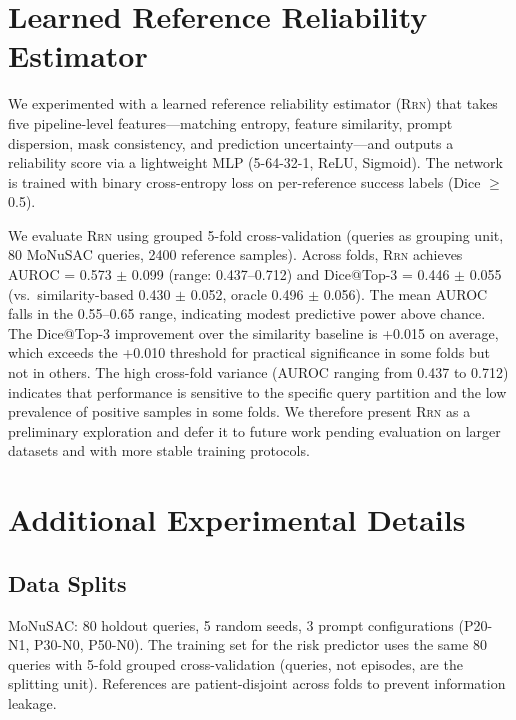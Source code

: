 \documentclass[11pt]{article}
\begin{document}
\appendix

\section{Learned Reference Reliability Estimator}
\label{sec:rrn}

We experimented with a learned reference reliability estimator (\textsc{Rrn})
that takes five pipeline-level features---matching entropy, feature
similarity, prompt dispersion, mask consistency, and prediction
uncertainty---and outputs a reliability score via a lightweight MLP (5-64-32-1,
ReLU, Sigmoid). The network is trained with binary cross-entropy loss on
per-reference success labels (Dice $\geq$ 0.5).

We evaluate \textsc{Rrn} using grouped 5-fold cross-validation (queries as
grouping unit, 80 MoNuSAC queries, 2400 reference samples). Across folds,
\textsc{Rrn} achieves AUROC = 0.573 $\pm$ 0.099 (range: 0.437--0.712) and
Dice@Top-3 = 0.446 $\pm$ 0.055 (vs.\ similarity-based 0.430 $\pm$ 0.052,
oracle 0.496 $\pm$ 0.056). The mean AUROC falls in the 0.55--0.65 range,
indicating modest predictive power above chance. The Dice@Top-3 improvement
over the similarity baseline is +0.015 on average, which exceeds the +0.010
threshold for practical significance in some folds but not in others. The
high cross-fold variance (AUROC ranging from 0.437 to 0.712) indicates that
performance is sensitive to the specific query partition and the
low prevalence of positive samples in some folds. We therefore present
\textsc{Rrn} as a preliminary exploration and defer it to future work
pending evaluation on larger datasets and with more stable training
protocols.

\section{Additional Experimental Details}

\subsection{Data Splits}

MoNuSAC: 80 holdout queries, 5 random seeds, 3 prompt configurations
(P20-N1, P30-N0, P50-N0). The training set for the risk predictor uses the
same 80 queries with 5-fold grouped cross-validation (queries, not
episodes, are the splitting unit). References are patient-disjoint across
folds to prevent information leakage.
\end{document}
